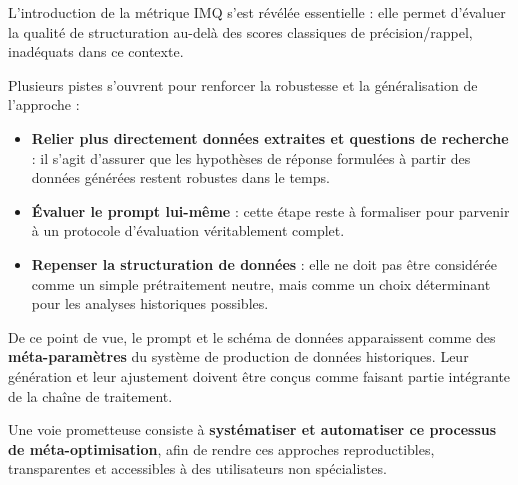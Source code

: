 L’introduction de la métrique IMQ s’est révélée essentielle : elle permet d’évaluer la qualité de structuration au-delà des scores classiques de précision/rappel, inadéquats dans ce contexte.

Plusieurs pistes s’ouvrent pour renforcer la robustesse et la généralisation de l’approche :

\begin{itemize}
\item \textbf{Relier plus directement données extraites et questions de recherche} : il s’agit d’assurer que les hypothèses de réponse formulées à partir des données générées restent robustes dans le temps.
\item \textbf{Évaluer le prompt lui-même} : cette étape reste à formaliser pour parvenir à un protocole d’évaluation véritablement complet.
\item \textbf{Repenser la structuration de données} : elle ne doit pas être considérée comme un simple prétraitement neutre, mais comme un choix déterminant pour les analyses historiques possibles.

\end{itemize}
De ce point de vue, le prompt et le schéma de données apparaissent comme des \textbf{méta-paramètres} du système de production de données historiques. Leur génération et leur ajustement doivent être conçus comme faisant partie intégrante de la chaîne de traitement.

Une voie prometteuse consiste à \textbf{systématiser et automatiser ce processus de méta-optimisation}, afin de rendre ces approches reproductibles, transparentes et accessibles à des utilisateurs non spécialistes.

